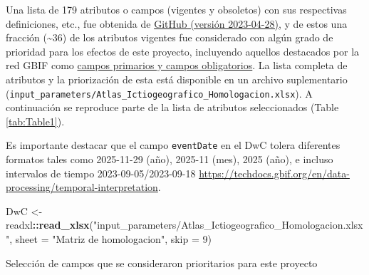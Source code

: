 \documentclass[sn-apa,pdflatex]{sn-jnl}
\newenvironment{Shaded}{\begin{snugshade}}{\end{snugshade}}
\newcommand{\AttributeTok}[1]{\textcolor[rgb]{0.13,0.29,0.53}{#1}}
\newcommand{\CommentTok}[1]{\textcolor[rgb]{0.56,0.35,0.01}{\textit{#1}}}
\newcommand{\DecValTok}[1]{\textcolor[rgb]{0.00,0.00,0.81}{#1}}
\newcommand{\FunctionTok}[1]{\textcolor[rgb]{0.13,0.29,0.53}{\textbf{#1}}}
\newcommand{\NormalTok}[1]{#1}
\newcommand{\OtherTok}[1]{\textcolor[rgb]{0.56,0.35,0.01}{#1}}
\newcommand{\SpecialCharTok}[1]{\textcolor[rgb]{0.81,0.36,0.00}{\textbf{#1}}}
\newcommand{\StringTok}[1]{\textcolor[rgb]{0.31,0.60,0.02}{#1}}
\begin{document}
Una lista de 179 atributos o campos (vigentes y obsoletos) con sus
respectivas definiciones, etc., fue obtenida de
\href{https://github.com/tdwg/dwc/blob/master/vocabulary/term_versions.csv}{GitHub
(versión 2023-04-28)}, y de estos una fracción (\textasciitilde36) de
los atributos vigentes fue considerado con algún grado de prioridad para
los efectos de este proyecto, incluyendo aquellos destacados por la red
GBIF como
\href{https://ipt.gbif.org/manual/en/ipt/latest/darwin-core}{campos
primarios y campos obligatorios}. La lista completa de atributos y la
priorización de esta está disponible en un archivo suplementario
(\texttt{input\_parameters/Atlas\_Ictiogeografico\_Homologacion.xlsx}).
A continuación se reproduce parte de la lista de atributos seleccionados
(Table \ref{tab:Table1}).

Es importante destacar que el campo \texttt{eventDate} en el DwC tolera
diferentes formatos tales como 2025-11-29 (año), 2025-11 (mes), 2025
(año), e incluso intervalos de tiempo 2023-09-05/2023-09-18
\url{https://techdocs.gbif.org/en/data-processing/temporal-interpretation}.

\begin{Shaded}
\begin{Highlighting}[]
\NormalTok{DwC }\OtherTok{\textless{}{-}}\NormalTok{ readxl}\SpecialCharTok{::}\FunctionTok{read\_xlsx}\NormalTok{(}\StringTok{"input\_parameters/Atlas\_Ictiogeografico\_Homologacion.xlsx"}\NormalTok{,}
    \AttributeTok{sheet =} \StringTok{"Matriz de homologacion"}\NormalTok{, }\AttributeTok{skip =} \DecValTok{9}\NormalTok{)}
\end{Highlighting}
\end{Shaded}

Selección de campos que se consideraron prioritarios para este proyecto

\begin{Shaded}
\end{Shaded}
\end{document}
